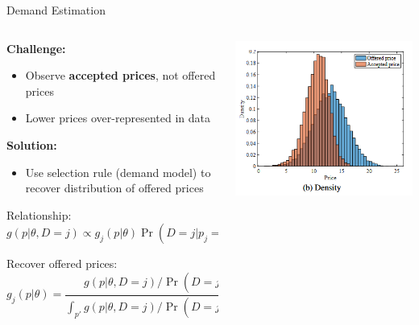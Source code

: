 \documentclass[10pt,aspectratio=169]{beamer}
\begin{document}
 \begin{frame}{Demand Estimation}\label{estimation:demand}
\begin{columns}[t]
\begin{column}{0.51\textwidth}
\textbf{Challenge:}
\begin{itemize}
    \item Observe \textbf{accepted prices}, not offered prices
    \item Lower prices over-represented in data
\end{itemize}

\vspace{0.3cm}
\textbf{Solution:}
\begin{itemize}
    \item Use selection rule (demand model) to recover distribution of offered prices
\end{itemize}

\vspace{0.2cm}
{\small
Relationship:
$$ g(p|\theta, D=j) \propto g_j(p|\theta) \Pr(D=j|p_j=p, \theta) $$

Recover offered prices:
$$ g_j(p|\theta) = \frac{g(p|\theta, D=j) / \Pr(D=j|p_j=p, \theta)}{\int_{p'} g(p|\theta, D=j) / \Pr(D=j|p_j=p', \theta)dp'} $$
}
\hyperlink{appendix:slide2}{}
\end{column}
\begin{column}{0.45\textwidth}
\vspace{0.5cm}
\begin{center}
\includegraphics[width=\textwidth]{Figures/Fig3B.png}
\end{center}
\end{column}
\end{columns}
\end{frame}
\end{document}
